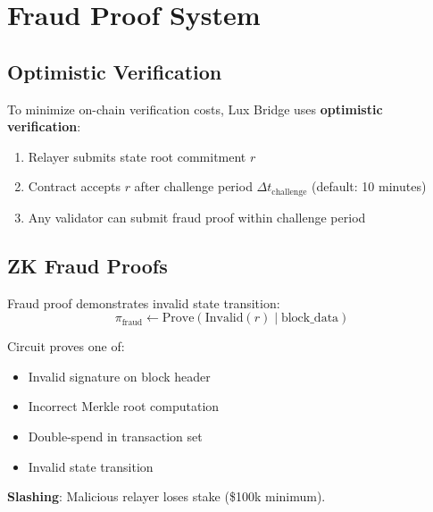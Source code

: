\section{Fraud Proof System}


\subsection{Optimistic Verification}

To minimize on-chain verification costs, Lux Bridge uses \textbf{optimistic verification}:

\begin{enumerate}
  \item Relayer submits state root commitment $r$
  \item Contract accepts $r$ after challenge period $\Delta t_{\text{challenge}}$ (default: 10 minutes)
  \item Any validator can submit fraud proof within challenge period
\end{enumerate}

\subsection{ZK Fraud Proofs}

Fraud proof demonstrates invalid state transition:
\begin{equation}
\pi_{\text{fraud}} \leftarrow \text{Prove}\left(\text{Invalid}(r) \mid \text{block\_data}\right)
\end{equation}

Circuit proves one of:
\begin{itemize}[leftmargin=1.1em]
  \item Invalid signature on block header
  \item Incorrect Merkle root computation
  \item Double-spend in transaction set
  \item Invalid state transition
\end{itemize}

\textbf{Slashing}: Malicious relayer loses stake (\$100k minimum).

